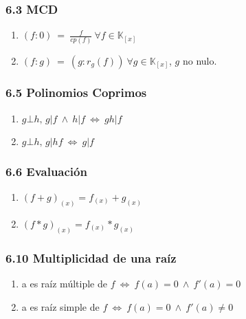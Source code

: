 \documentclass{article}
\newcommand{\lands}{\:\land\:}                          %
\newcommand{\comma}{,\,}                                %
\newcommand{\eq}{\:=\:}                                 %
\newcommand{\cuerpo}{\mathbb{K}}                        %
\newcommand{\Leftrightarrows}{\: \Leftrightarrow \:}    %
\begin{document}
\subsubsection*{6.3 MCD}
\begin{enumerate}
    \item $(f:0) \eq \frac{f}{cp(f)} \: \forall f \in \cuerpo_{[x]}$
    \item $(f:g) \eq (g:r_g(f)) \: \forall g \in \cuerpo_{[x]}$, $g$ no nulo.
\end{enumerate}
\subsubsection*{6.5 Polinomios Coprimos}
\begin{enumerate}
    \item $g \bot h \comma g|f \lands h|f \Leftrightarrows gh|f$
    \item $g \bot h \comma g|hf \Leftrightarrows g|f$
\end{enumerate}
\subsubsection*{6.6 Evaluación}
\begin{enumerate}
    \item $(f+g)_{(x)} = f_{(x)}+g_{(x)}$
    \item $(f*g)_{(x)} = f_{(x)} * g_{(x)}$
\end{enumerate}
\subsubsection*{6.10 Multiplicidad de una raíz}
\begin{enumerate}
    \item a es raíz múltiple de $f \Leftrightarrows f(a)=0 \lands f'(a)=0$
    \item a es raíz simple de $f \Leftrightarrows f(a)=0 \lands f'(a)\neq 0$
\end{enumerate}
\end{document}
